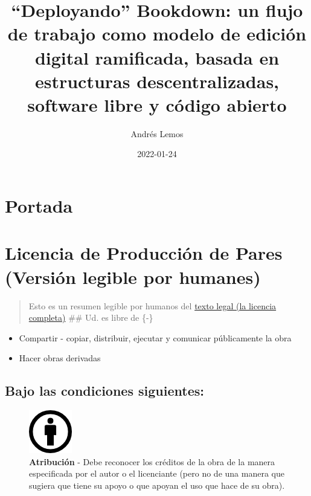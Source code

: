 \documentclass[
]{book}
\title{``Deployando'' Bookdown: un flujo de trabajo como modelo de edición digital ramificada, basada en estructuras descentralizadas, software libre y código abierto}
\author{Andrés Lemos}
\date{2022-01-24}
\providecommand{\tightlist}{%
  \setlength{\itemsep}{0pt}\setlength{\parskip}{0pt}}
\begin{document}
\maketitle

{
\setcounter{tocdepth}{1}
\tableofcontents
}
\hypertarget{portada}{%
\chapter*{Portada}\label{portada}}

\hypertarget{licencia-de-producciuxf3n-de-pares-versiuxf3n-legible-por-humanes}{%
\chapter*{Licencia de Producción de Pares (Versión legible por humanes)}\label{licencia-de-producciuxf3n-de-pares-versiuxf3n-legible-por-humanes}}

\begin{quote}
Esto es un resumen legible por humanos del \href{http://endefensadelsl.org/ppl_es.html}{texto legal (la licencia
completa)}
\#\# Ud. es libre de \{-\}
\end{quote}

\begin{itemize}
\tightlist
\item
  Compartir - copiar, distribuir, ejecutar y comunicar públicamente la obra
\item
  Hacer obras derivadas
\end{itemize}

\hypertarget{bajo-las-condiciones-siguientes}{%
\section*{Bajo las condiciones siguientes:}\label{bajo-las-condiciones-siguientes}}

\begin{figure}
\centering
\includegraphics{images/by.png}
\caption{\textbf{Atribución} - Debe reconocer los créditos de la obra de la manera
especificada por el autor o el licenciante (pero no de una manera que sugiera
que tiene su apoyo o que apoyan el uso que hace de su obra).}
\end{figure}
\end{document}
